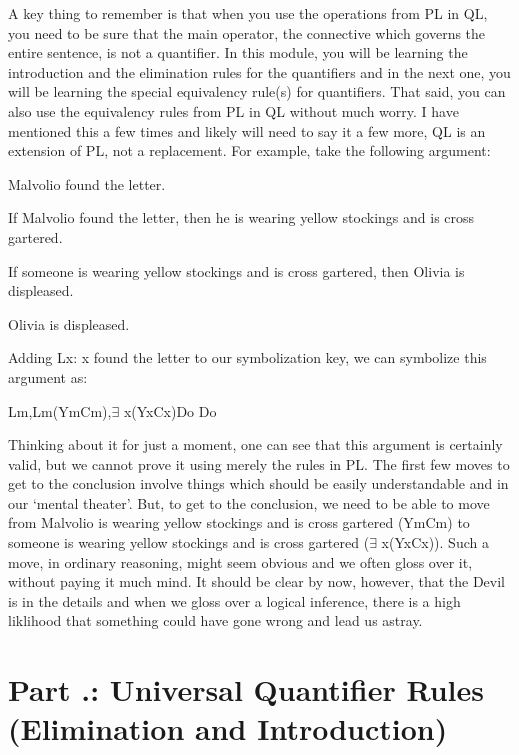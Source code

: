 A key thing to remember is that when you use the operations from PL in QL, you need to be sure that the main operator, the connective which governs the entire sentence, is not a quantifier. In this module, you will be learning the introduction and the elimination rules for the quantifiers and in the next one, you will be learning the special equivalency rule(s) for quantifiers. That said, you can also use the equivalency rules from PL in QL without much worry. I have mentioned this a few times and likely will need to say it a few more, QL is an extension of PL, not a replacement. For example, take the following argument:
\begin{earg}
\item[]Malvolio found the letter.
\item[]If Malvolio found the letter, then he is wearing yellow stockings and is cross gartered.
\item[]If someone is wearing yellow stockings and is cross gartered, then Olivia is displeased.
\item[\therefore ] Olivia is displeased.
\end{earg}
Adding Lx: x found the letter to our symbolization key, we can symbolize this argument as:
\begin{center}
Lm,Lm\eif (Ym\eand Cm),$\exists$ x(Yx\eand Cx)\eif Do \therefore Do
\end{center}
Thinking about it for just a moment, one can see that this argument is certainly valid, but we cannot prove it using merely the rules in PL. The first few moves to get to the conclusion involve things which should be easily understandable and in our ‘mental theater'. But, to get to the conclusion, we need to be able to move from Malvolio is wearing yellow stockings and is cross gartered (Ym\eand Cm) to someone is wearing yellow stockings and is cross gartered ($\exists$ x(Yx\eand Cx)). Such a move, in ordinary reasoning, might seem obvious and we often gloss over it, without paying it much mind. It should be clear by now, however, that the Devil is in the details and when we gloss over a logical inference, there is a high liklihood that something could have gone wrong and lead us astray.
\section{Part \thechapcount.\theseccount: Universal Quantifier Rules (Elimination and Introduction)}

